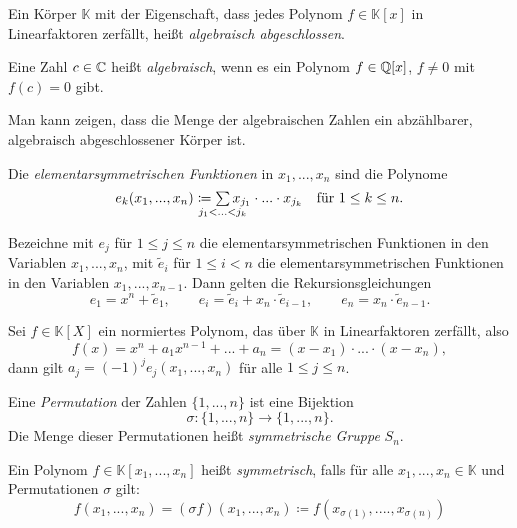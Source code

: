 \documentclass{cheat-sheet}
\newcommand{\K}{\mathbb{K}} %
\begin{document}
\begin{defn}
  Ein Körper $\K$ mit der Eigenschaft, dass jedes Polynom $f \in \K[x]$ in Linearfaktoren zerfällt, heißt \emph{algebraisch abgeschlossen}.
\end{defn}

\begin{defn}
  Eine Zahl $c \in \mathbb{C}$ heißt \emph{algebraisch}, wenn es ein Polynom $f \in \mathbb{Q}[x]$, $f \not= 0$ mit $f(c) = 0$ gibt.
\end{defn}

\begin{bem}
  Man kann zeigen, dass die Menge der algebraischen Zahlen ein abzählbarer, algebraisch abgeschlossener Körper ist.
\end{bem}


\begin{defn}
  Die \emph{elementarsymmetrischen Funktionen} in $x_1, ..., x_n$ sind die Polynome
  \[
    e_k(x_1, ..., x_n) \coloneqq \sum_{\mathclap{j_1 < ... < j_k}} x_{j_1} \cdot ... \cdot x_{j_k}
    \quad \text{für $1 \leq k \leq n$.}
  \]
\end{defn}

\begin{bem}
  Bezeichne mit $e_j$ für $1 \leq j \leq n$ die elementarsymmetrischen Funktionen in den Variablen $x_1, ..., x_n$, mit $\tilde{e}_i$ für $1 \leq i < n$ die elementarsymmetrischen Funktionen in den Variablen $x_1, ..., x_{n-1}$. Dann gelten die Rekursionsgleichungen
  \[
    e_1 = x^n + \tilde{e}_1, \qquad
    e_i = \tilde{e}_i + x_n \cdot \tilde{e}_{i-1}, \qquad
    e_n = x_n \cdot \tilde{e}_{n-1}.
  \]
\end{bem}

\begin{satz}[Vieta]
  Sei $f \in \K[X]$ ein normiertes Polynom, das über $\K$ in Linearfaktoren zerfällt, also
  \[ f(x) = x^n + a_1 x^{n-1} + ... + a_n = (x-x_1) \cdot ... \cdot (x-x_n), \]
  dann gilt $a_j = (-1)^j e_j(x_1, ..., x_n)$ für alle $1 \leq j \leq n$.
\end{satz}

\begin{defn}
  Eine \emph{Permutation} der Zahlen $\{ 1, ..., n \}$ ist eine Bijektion
  \[ \sigma : \{ 1, ..., n \} \to \{ 1, ..., n \}. \]
  Die Menge dieser Permutationen heißt \emph{symmetrische Gruppe} $S_n$.
\end{defn}

\begin{defn}
  Ein Polynom $f \in \K[x_1, ..., x_n]$ heißt \emph{symmetrisch}, falls für alle $x_1, ..., x_n \in \K$ und Permutationen $\sigma$ gilt:
  \[ f(x_1, ..., x_n) = (\sigma f)(x_1, ..., x_n) \coloneqq f(x_{\sigma(1)}, ...., x_{\sigma(n)}) \]
\end{defn}
\end{document}
